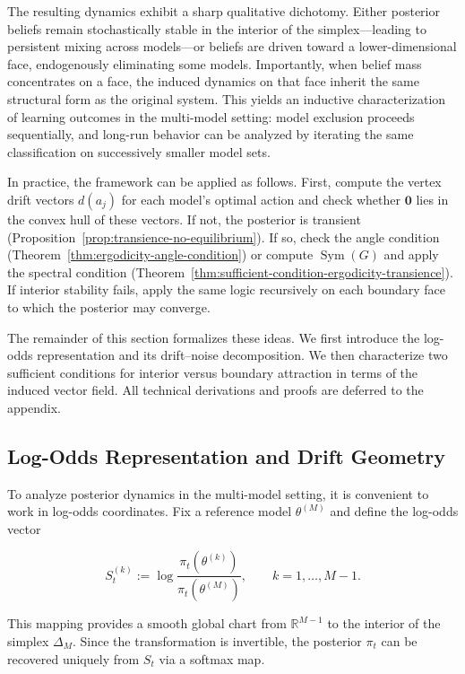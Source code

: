\documentclass[12pt]{article}
\DeclareMathOperator{\Sym}{Sym}
\begin{document}
The resulting dynamics exhibit a sharp qualitative dichotomy.
Either posterior beliefs remain stochastically stable in the interior of the simplex---leading to persistent mixing across models---or beliefs are driven toward a lower-dimensional face, endogenously eliminating some models.
Importantly, when belief mass concentrates on a face, the induced dynamics on that face inherit the same structural form as the original system.
This yields an inductive characterization of learning outcomes in the multi-model setting: model exclusion proceeds sequentially, and long-run behavior can be analyzed by iterating the same classification on successively smaller model sets.

In practice, the framework can be applied as follows. First, compute the vertex drift vectors $d(a_j)$ for each model's optimal action and check whether $\mathbf{0}$ lies in the convex hull of these vectors. If not, the posterior is transient (Proposition~\ref{prop:transience-no-equilibrium}). If so, check the angle condition (Theorem~\ref{thm:ergodicity-angle-condition}) or compute $\Sym(G)$ and apply the spectral condition (Theorem~\ref{thm:sufficient-condition-ergodicity-transience}). If interior stability fails, apply the same logic recursively on each boundary face to which the posterior may converge.

The remainder of this section formalizes these ideas.
We first introduce the log-odds representation and its drift--noise decomposition.
We then characterize two sufficient conditions for interior versus boundary attraction in terms of the induced vector field.
All technical derivations and proofs are deferred to the appendix.

\subsection{Log-Odds Representation and Drift Geometry}

To analyze posterior dynamics in the multi-model setting, it is convenient to work in log-odds coordinates.
Fix a reference model $\theta^{(M)}$ and define the log-odds vector

\[
S_t^{(k)} := \log \frac{\pi_t(\theta^{(k)})}{\pi_t(\theta^{(M)})},
\qquad k = 1,\ldots,M-1.
\]

This mapping provides a smooth global chart from $\mathbb{R}^{M-1}$ to the interior of the simplex $\Delta_M$.
Since the transformation is invertible, the posterior $\pi_t$ can be recovered uniquely from $S_t$ via a softmax map.
\end{document}
